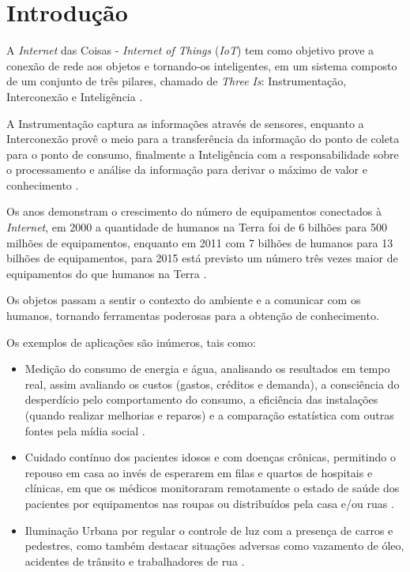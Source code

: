 %


\chapter{Introdução}

A \textit{Internet} das Coisas - \textit{Internet of Things} (\textit{IoT}) tem como objetivo prove a conexão de rede aos
objetos e tornando-os inteligentes, em um sistema composto de um conjunto de
três pilares, chamado de \textit{Three Is}: Instrumentação, Interconexão e
Inteligência \cite{mqttibm2012}.

A Instrumentação captura as informações através de sensores, enquanto a
Interconexão provê o meio para a transferência da informação do ponto de coleta
para o ponto de consumo, finalmente a Inteligência com a responsabilidade sobre
o processamento e análise da informação para derivar o máximo de valor e
conhecimento \cite{mqttibm2012}.

Os anos demonstram o crescimento do número de equipamentos conectados à
\textit{Internet}, em 2000 a quantidade de humanos na Terra foi de 6 bilhões
para 500 milhões de equipamentos, enquanto em 2011 com 7 bilhões de humanos
para 13 bilhões de equipamentos, para 2015 está previsto um número três vezes
maior de equipamentos do que humanos na Terra \cite{mirkopresser2012}.

Os objetos passam a sentir o contexto do ambiente e a comunicar com os humanos,
tornando ferramentas poderosas para a obtenção de conhecimento.

Os exemplos de aplicações são inúmeros, tais como:

\begin{itemize}

    \item Medição do consumo de energia e água, analisando os resultados em
      tempo real, assim avaliando os custos (gastos, créditos e demanda), a
      consciência do desperdício pelo comportamento do consumo, a eficiência
      das instalações (quando realizar melhorias e reparos) e a comparação
      estatística com outras fontes pela mídia social \cite{mirkopresser2012}.

    \item Cuidado contínuo dos pacientes idosos e com doenças crônicas,
      permitindo o repouso em casa ao invés de esperarem em filas e quartos de
      hospitais e clínicas, em que os médicos monitoraram remotamente o estado
      de saúde dos pacientes por equipamentos nas roupas ou distribuídos pela
      casa e/ou ruas \cite{mirkopresser2012}.

    \item Iluminação Urbana por regular o controle de luz com a presença de
      carros e pedestres, como também destacar situações adversas como
      vazamento de óleo, acidentes de trânsito e trabalhadores de rua
      \cite{mirkopresser2012}.

\end{itemize}

